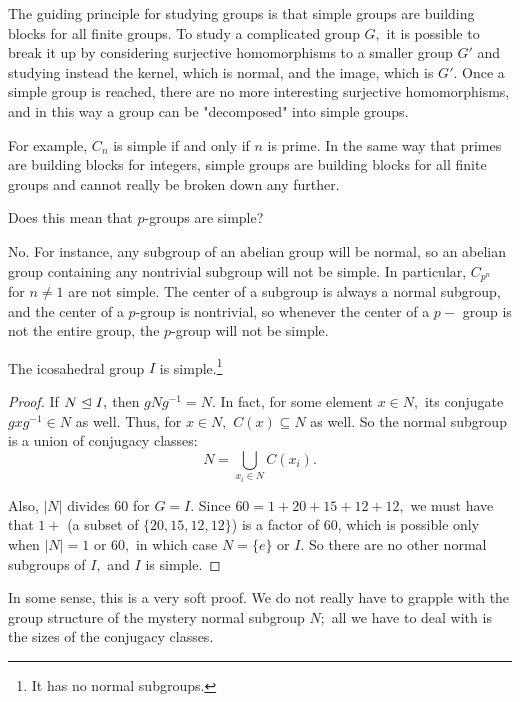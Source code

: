 The guiding principle for studying groups is that simple groups are building blocks for all finite groups. To study a complicated group $G,$ it is possible to break it up by considering surjective homomorphisms to a smaller group $G'$ and studying instead the kernel, which is normal, and the image, which is $G'.$ Once a simple group is reached, there are no more interesting surjective homomorphisms, and in this way a group can be "decomposed" into simple groups.

For example, $C_n$ is simple if and only if $n$ is prime. In the same way that primes are building blocks for integers, simple groups are building blocks for all finite groups and cannot really be broken down any further.

\begin{question}
Does this mean that $p$-groups are simple? 
\end{question}

\begin{ans}
No. For instance, any subgroup of an abelian group will be normal, so an abelian group containing any nontrivial subgroup will not be simple. In particular, $C_{p^n}$ for $n \neq 1$ are not simple. The center of a subgroup is always a normal subgroup, and the center of a $p$-group is nontrivial, so whenever the center of a $p-$ group is not the entire group, the $p$-group will not be simple.
\end{ans}

\begin{theorem}
The icosahedral group $I$ is simple.\footnote{It has no normal subgroups.}
\end{theorem}

\begin{proof}
If $N \trianglelefteq I,$ then $gNg^{-1} = N.$ In fact, for some element $x \in N,$ its conjugate $gxg^{-1} \in N$ as well. Thus, for $x \in N,$ $C(x) \subseteq N$ as well. So the normal subgroup is a union of conjugacy classes:
\[
N = \bigcup_{x_i \in N} C(x_i).
\]

Also, $|N|$ divides 60 for $G = I.$ Since $60 = 1 + 20 + 15 + 12 + 12,$ we must have that $1 + $ (a subset of $\{20, 15, 12, 12\}$) is a factor of 60, which is possible only when $|N| = 1$ or $60,$ in which case $N = \{e\}$ or $I.$ So there are no other normal subgroups of $I,$ and $I$ is simple.
\end{proof}

In some sense, this is a very soft proof. We do not really have to grapple with the group structure of the mystery normal subgroup $N;$ all we have to deal with is the sizes of the conjugacy classes. 

